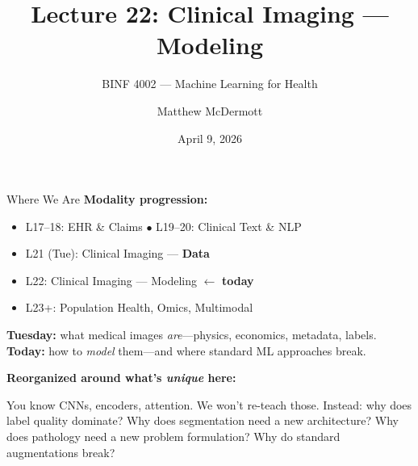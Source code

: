 \documentclass[aspectratio=169,10pt]{beamer}
\title{Lecture 22: Clinical Imaging --- Modeling}
\subtitle{BINF 4002 --- Machine Learning for Health}
\author{Matthew McDermott}
\institute{Dept.\ of Biomedical Informatics, Columbia University}
\date{April 9, 2026}
\begin{document}
\begin{frame}[noframenumbering]
\maketitle
\end{frame}

\begin{frame}{Where We Are}
\textbf{Modality progression:}
\begin{itemize}
    \item[\textcolor{columbiagray}{$\bullet$}] L17--18: EHR \& Claims \quad\textcolor{columbiagray}{$\bullet$} L19--20: Clinical Text \& NLP
    \item[\textcolor{columbiagray}{$\bullet$}] L21 (Tue): Clinical Imaging --- \textbf{Data}
    \item[\textcolor{columbiaaccent}{$\to$}] \alert{L22: Clinical Imaging --- Modeling} $\gets$ \textbf{today}
    \item[\textcolor{columbiagray}{$\circ$}] L23+: Population Health, Omics, Multimodal
\end{itemize}

\vspace{0.2em}
\textbf{Tuesday:} what medical images \emph{are}---physics, economics, metadata, labels.\\
\textbf{Today:} how to \emph{model} them---and where standard ML approaches break.

\vspace{0.2em}
\textbf{Reorganized around what's \emph{unique} here:}

{\small You know CNNs, encoders, attention. We won't re-teach those. Instead: why does label quality dominate? Why does segmentation need a new architecture? Why does pathology need a new problem formulation? Why do standard augmentations break?}
\end{frame}
\end{document}
